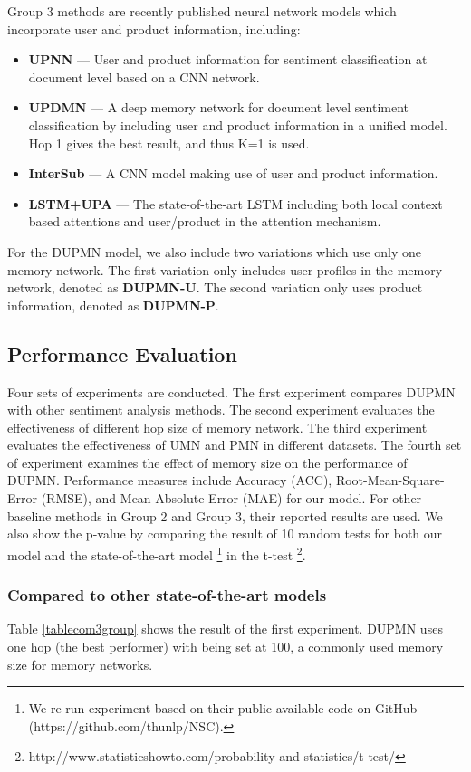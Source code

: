 \documentclass[11pt,a4paper]{article}
\begin{document}
Group 3 methods are recently published neural network models which incorporate user and product information, including:
\begin{itemize}
\item \textbf{UPNN} \cite{tang2015learning} --- User and product information for sentiment classification at document level based on a CNN network.
\item \textbf{UPDMN} \cite{dou2017capturing} --- A deep memory network for document level sentiment classification by including user and product information in a unified model. Hop 1 gives the best result, and  thus K=1 is used.
\item \textbf{InterSub} \cite{gui2016intersubjectivity} --- A CNN model making use of user and product information.
\item \textbf{LSTM+UPA} \cite{chen2016neural} --- The state-of-the-art LSTM including both local context based attentions and user/product in the attention mechanism.
\end{itemize}

For the DUPMN model, we also include two variations which use only one memory network. The first variation only includes user profiles in the memory network, denoted as \textbf{DUPMN-U}. The second variation only uses product information, denoted as \textbf{DUPMN-P}.

\subsection{Performance Evaluation}
Four sets of experiments are conducted. The first experiment compares DUPMN with other sentiment analysis methods. The second experiment evaluates the effectiveness of different hop size  of memory network. The third experiment evaluates the effectiveness of UMN and PMN in different datasets. The fourth set of experiment examines the effect of memory size  on the performance of DUPMN. Performance measures include Accuracy (ACC), Root-Mean-Square-Error (RMSE), and Mean Absolute Error (MAE) for our model. For other baseline methods in Group 2 and Group 3, their reported results are used. We also show the p-value by comparing the result of 10 random tests for both our model and the state-of-the-art model \footnote{We re-run experiment based on their public available code on GitHub (https://github.com/thunlp/NSC).} in the t-test \footnote{http://www.statisticshowto.com/probability-and-statistics/t-test/}.

\subsubsection*{Compared to other state-of-the-art models}
Table \ref{tablecom3group} shows the result of the first experiment. DUPMN uses one hop (the best performer) with  being set at 100, a commonly used memory size for memory networks.
\end{document}
